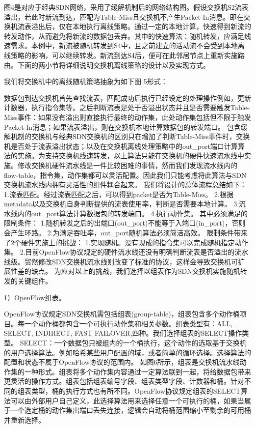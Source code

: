 图4是对应于经典SDN网络，采用了缓解机制后的网络结构图。假设交换机S2流表溢出，若此时新流到达，匹配为Table-Miss且交换机不产生Packet-In消息。即在交换机流表溢出后，仅在本地执行离线策略。通过一定的本地计算，快速得到新流的转发动作，从而避免将新流的数据包丢弃。其中的快速算法：随机转发，应满足线速需求。本例中，新流被随机转发到S4中，且之前建立的活动流不会受到本地离线策略的影响，可以继续转发。新流到达S4后，便可在此邻居节点上重新实施路由。下面的两小节将详细说明交换机离线策略的设计以及实现方式。


我们将交换机中的离线随机策略抽象为如下图 5形式：


数据包到达交换机首先查找流表，匹配成功后执行已经设定的处理操作例如，更新计数器，执行指令集等。之后判断流表是处于否溢出状态并且是否需要触发Table-Miss事件：如果没有溢出则直接执行最终的动作集，此处动作集包括但不限于触发Packet-In消息；如果流表溢出，则在交换机本地计算数据包的转发端口。
包含缓解机制的交换机与经典SDN交换机的区别只在增加了判断Table-Miss事件时，交换机是否处于流表溢出状态；以及在交换机离线处理策略中的out\_port端口计算算法的实施。为支持交换机线速转发，以上算法只能在交换机的硬件快速流水线中实施。修改交换机硬件流水线是一件比较困难的事情，然而我们发现流水线内的flow-table，指令集，动作集都可以灵活配置。因此我们只能考虑将此算法与SDN交换机流水线内拥有灵活性的组件耦合起来。
我们将设计的总体流程总结如下：
1.流表匹配。经过流表匹配之后，可以得到packet是否为Table-Miss。 
2.根据metadata以及交换机自身判断提供的流表使用率，判断是否需要本地计算。
3.流水线内的out\_port算法计算数据包的转发端口。
4.执行动作集。
其中必须满足的限制条件：
1.随机转发之后的出端口(out\_port)不能等于入端口(in\_port)，否则会产生环路。
2.为满足吞吐率，out\_port随机算法必须简洁高效。
限制条件带来了2个硬件实施上的挑战：
1.实现随机。没有现成的指令集可以完成随机指定动作集。
2.目前OpenFlow协议规定的硬件流水线还没有明确判断流表是否溢出的流水线级。贸然修改SDN交换机流水线则改变了标准的协议，这样会导致交换机可扩展性差的缺点。
为应对以上的挑战，我们选择以组表作为SDN交换机实施随机转发的关键组件。




1）OpenFlow组表。

OpenFlow协议规定SDN交换机需包括组表(group-table)，组表包含多个动作桶项目。每一个动作桶都包含一个可执行动作集和相关参数。组表类型有：ALL, SELECT, INDIRECT, FAST FAILOVER,四种。我们选择组表的SELECT操作类型。
SELECT：一个数据包只被组内的一个桶执行，这个动作的选取基于交换机的用户选择算法。例如哈希某些用户配置的域，或者简单的循环选择。选择算法的配置和状态不属于OpenFlow协议的范围内。
如图6所示，组表是交换机流水线动作集的一种形式。组表将多个动作集内容通过一定算法联到一起，将给数据包带来更灵活的操作方式。组表包括组表编号字段、组表类型字段、计数器和桶。针对不同的组表类型，桶的执行方式也有所不同。OpenFlow协议规定组表的SELECT算法可以由外部用户自己定义，此选择算法用来选择任意一个可执行的桶，如果当属于一个选定桶的动作集出端口丢失连接，逻辑会自动将桶范围缩小至剩余的可用桶并重新选择。

